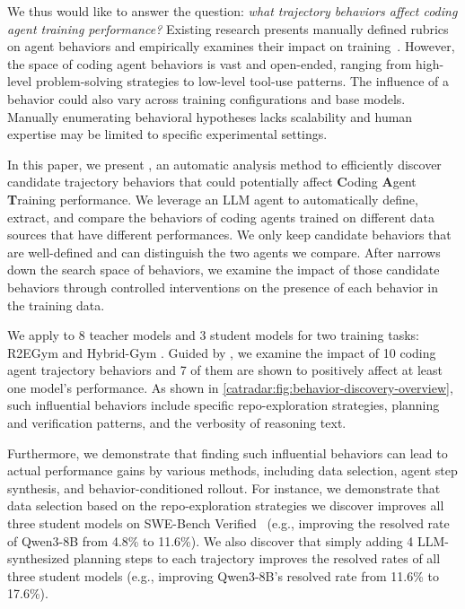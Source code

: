 We thus would like to answer the question: \emph{what trajectory behaviors affect coding agent training performance?}
Existing research presents manually defined rubrics on agent behaviors and empirically examines their impact on training~\citep{terminal-lego,openhands-rubric-critique,hybrid-gym}.
However, the space of coding agent behaviors is vast and open-ended, ranging from high-level problem-solving strategies to low-level tool-use patterns.
The influence of a behavior could also vary across training configurations and base models.
Manually enumerating behavioral hypotheses lacks scalability and human expertise may be limited to specific experimental settings.

In this paper, we present \toolName, an automatic analysis method to efficiently discover candidate trajectory behaviors that could potentially affect \textbf{C}oding \textbf{A}gent \textbf{T}raining performance.
We leverage an LLM agent to automatically define, extract, and compare the behaviors of coding agents trained on different data sources that have different performances.
We only keep candidate behaviors that are well-defined and can distinguish the two agents we compare.
After \toolName narrows down the search space of behaviors, we examine the impact of those candidate behaviors through controlled interventions on the presence of each behavior in the training data.


We apply \toolName to 8 teacher models and 3 student models for two training tasks: R2EGym \citep{R2EGym} and Hybrid-Gym \citep{hybrid-gym}.
Guided by \toolName, we examine the impact of 10 coding agent trajectory behaviors and 7 of them are shown to positively affect at least one model's performance.
As shown in \autoref{catradar:fig:behavior-discovery-overview}, such influential behaviors include specific repo-exploration strategies, planning and verification patterns, and the verbosity of reasoning text.


Furthermore, we demonstrate that finding such influential behaviors can lead to actual performance gains by various methods, including data selection, agent step synthesis, and behavior-conditioned rollout.
For instance, we demonstrate that data selection based on the repo-exploration strategies we discover improves all three student models on SWE-Bench Verified~\citep{swebench} (e.g., improving the resolved rate of Qwen3-8B from 4.8\% to 11.6\%).
We also discover that simply adding 4 LLM-synthesized planning steps to each trajectory improves the resolved rates of all three student models (e.g., improving Qwen3-8B's resolved rate from 11.6\% to 17.6\%).




